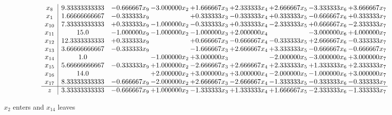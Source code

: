 \documentclass[10pt]{article}
\begin{document}
 \[\begin{array}{c| c c@{\hskip 2pt} c@{\hskip 2pt} c@{\hskip 2pt} c@{\hskip 2pt} c@{\hskip 2pt} c@{\hskip 2pt} c@{\hskip 2pt} }
 x_{8}   &  9.33333333333 & -0.666667 x_{9} & -3.000000 x_{2} & + 1.666667 x_{3} & + 2.333333 x_{4} & + 2.666667 x_{5} & -3.333333 x_{6} & + 3.666667 x_{7}\\
 x_{1}   &  1.66666666667 & -0.333333 x_{9} &   & + 0.333333 x_{3} & -0.333333 x_{4} & + 0.333333 x_{5} & -0.666667 x_{6} & + 0.333333 x_{7}\\
 x_{10}   &  7.33333333333 & + 0.333333 x_{9} & -1.000000 x_{2} & -0.333333 x_{3} & + 0.333333 x_{4} & -2.333333 x_{5} & + 0.666667 x_{6} & -2.333333 x_{7}\\
 x_{11}   &  15.0 & -1.000000 x_{9} & -1.000000 x_{2} & -1.000000 x_{3} & + 2.000000 x_{4} &   & -3.000000 x_{6} & + 4.000000 x_{7}\\
 x_{12}   &  12.3333333333 & + 0.333333 x_{9} &   & + 0.666667 x_{3} & -0.666667 x_{4} & -0.333333 x_{5} & + 2.666667 x_{6} & -0.333333 x_{7}\\
 x_{13}   &  3.66666666667 & -0.333333 x_{9} &   & -1.666667 x_{3} & + 2.666667 x_{4} & + 3.333333 x_{5} & -0.666667 x_{6} & -0.666667 x_{7}\\
 x_{14}   &  1.0  &   & -1.000000 x_{2} & + 3.000000 x_{3} &   & -2.000000 x_{5} & -3.000000 x_{6} & + 3.000000 x_{7}\\
 x_{15}   &  5.66666666667 & -0.333333 x_{9} & + 1.000000 x_{2} & -2.666667 x_{3} & + 2.666667 x_{4} & + 2.333333 x_{5} & + 1.333333 x_{6} & + 2.333333 x_{7}\\
 x_{16}   &  14.0  &   & + 2.000000 x_{2} & + 3.000000 x_{3} & + 3.000000 x_{4} & -2.000000 x_{5} & -1.000000 x_{6} & + 3.000000 x_{7}\\
 x_{17}   &  8.33333333333 & -0.666667 x_{9} & -2.000000 x_{2} & + 2.666667 x_{3} & -2.666667 x_{4} & -1.333333 x_{5} & -0.333333 x_{6} & -0.333333 x_{7}\\
\hline
z    &  3.33333333333 & -0.666667 x_{9} & + 1.000000 x_{2} & -1.333333 x_{3} & + 1.333333 x_{4} & + 1.666667 x_{5} & -2.333333 x_{6} & -1.333333 x_{7}\\
\end{array}\]


 $ x_{2} $ enters and $ x_{14} $ leaves 
\end{document}
